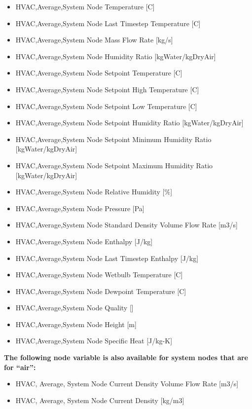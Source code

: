 \begin{itemize}
\item
  HVAC,Average,System Node Temperature {[}C{]}
\item
  HVAC,Average,System Node Last Timestep Temperature {[}C{]}
\item
  HVAC,Average,System Node Mass Flow Rate {[}kg/s{]}
\item
  HVAC,Average,System Node Humidity Ratio {[}kgWater/kgDryAir{]}
\item
  HVAC,Average,System Node Setpoint Temperature {[}C{]}
\item
  HVAC,Average,System Node Setpoint High Temperature {[}C{]}
\item
  HVAC,Average,System Node Setpoint Low Temperature {[}C{]}
\item
  HVAC,Average,System Node Setpoint Humidity Ratio {[}kgWater/kgDryAir{]}
\item
  HVAC,Average,System Node Setpoint Minimum Humidity Ratio {[}kgWater/kgDryAir{]}
\item
  HVAC,Average,System Node Setpoint Maximum Humidity Ratio {[}kgWater/kgDryAir{]}
\item
  HVAC,Average,System Node Relative Humidity {[}\%{]}
\item
  HVAC,Average,System Node Pressure {[}Pa{]}
\item
  HVAC,Average,System Node Standard Density Volume Flow Rate {[}m3/s{]}
\item
  HVAC,Average,System Node Enthalpy {[}J/kg{]}
\item
  HVAC,Average,System Node Last Timestep Enthalpy {[}J/kg{]}
\item
  HVAC,Average,System Node Wetbulb Temperature {[}C{]}
\item
  HVAC,Average,System Node Dewpoint Temperature {[}C{]}
\item
  HVAC,Average,System Node Quality {[]}
\item
  HVAC,Average,System Node Height {[}m{]}
\item
  HVAC,Average,System Node Specific Heat {[}J/kg-K{]}
\end{itemize}

\textbf{The following node variable is also available for system nodes that are for ``air'':}

\begin{itemize}
\item
  HVAC, Average, System Node Current Density Volume Flow Rate {[}m3/s{]}
\item
  HVAC, Average, System Node Current Density {[}kg/m3{]}
\end{itemize}

